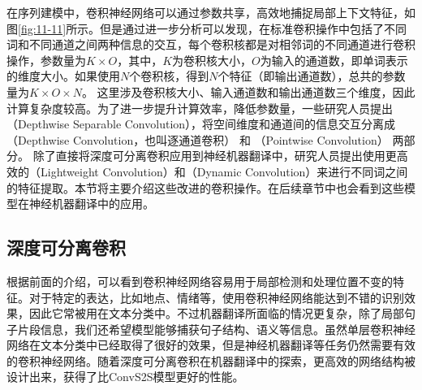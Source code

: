 \parinterval 在序列建模中，卷积神经网络可以通过参数共享，高效地捕捉局部上下文特征，如图\ref{fig:11-11}所示。但是通过进一步分析可以发现，在标准卷积操作中包括了不同词和不同通道之间两种信息的交互，每个卷积核都是对相邻词的不同通道进行卷积操作，参数量为$K \times O$，其中，$K$为卷积核大小，$O$为输入的通道数，即单词表示的维度大小。如果使用$N$个卷积核，得到$N$个特征（即输出通道数），总共的参数量为$K \times O \times N$。 这里涉及卷积核大小、输入通道数和输出通道数三个维度，因此计算复杂度较高。为了进一步提升计算效率，降低参数量，一些研究人员提出{\small{}}（Depthwise Separable Convolution），将空间维度和通道间的信息交互分离成{\small{}}（Depthwise Convolution，也叫逐通道卷积） 和{\small{}} （Pointwise Convolution） 两部分。 除了直接将深度可分离卷积应用到神经机器翻译中，研究人员提出使用更高效的{\small{}}（Lightweight Convolution）和{\small{}}（Dynamic Convolution）来进行不同词之间的特征提取。本节将主要介绍这些改进的卷积操作。在后续章节中也会看到这些模型在神经机器翻译中的应用。


\subsection{深度可分离卷积}
\label{sec:11.3.1}

\parinterval 根据前面的介绍，可以看到卷积神经网络容易用于局部检测和处理位置不变的特征。对于特定的表达，比如地点、情绪等，使用卷积神经网络能达到不错的识别效果，因此它常被用在文本分类中。不过机器翻译所面临的情况更复杂，除了局部句子片段信息，我们还希望模型能够捕获句子结构、语义等信息。虽然单层卷积神经网络在文本分类中已经取得了很好的效果，但是神经机器翻译等任务仍然需要有效的卷积神经网络。随着深度可分离卷积在机器翻译中的探索，更高效的网络结构被设计出来，获得了比ConvS2S模型更好的性能。

